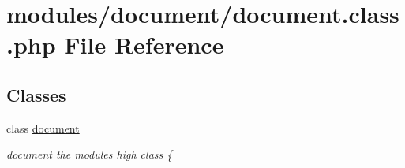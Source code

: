 \hypertarget{document_8class_8php}{}\section{modules/document/document.class.\+php File Reference}
\label{document_8class_8php}
\subsection*{Classes}
\begin{DoxyCompactItemize}
\item 
class \hyperlink{classdocument}{document}
\begin{DoxyCompactList}\small\item\em document the module\textquotesingle{}s high class \{ \end{DoxyCompactList}\end{DoxyCompactItemize}
